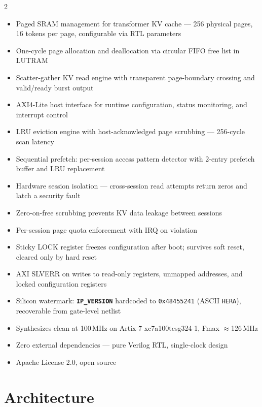 \documentclass[10pt, a4paper]{article}
\newcommand{\reg}[1]{\texttt{\textbf{#1}}}
\newcommand{\hex}[1]{\texttt{0x#1}}
\begin{document}
\begin{multicols}{2}
\begin{itemize}
  \item Paged SRAM management for transformer KV cache — 256 physical pages,
        16 tokens per page, configurable via RTL parameters
  \item One-cycle page allocation and deallocation via circular FIFO free list
        in LUTRAM
  \item Scatter-gather KV read engine with transparent page-boundary crossing
        and valid/ready burst output
  \item AXI4-Lite host interface for runtime configuration, status monitoring,
        and interrupt control
  \item LRU eviction engine with host-acknowledged page scrubbing — 256-cycle
        scan latency
  \item Sequential prefetch: per-session access pattern detector with 2-entry
        prefetch buffer and LRU replacement
  \item Hardware session isolation — cross-session read attempts return zeros
        and latch a security fault
  \item Zero-on-free scrubbing prevents KV data leakage between sessions
  \item Per-session page quota enforcement with IRQ on violation
  \item Sticky LOCK register freezes configuration after boot; survives soft
        reset, cleared only by hard reset
  \item AXI SLVERR on writes to read-only registers, unmapped addresses, and
        locked configuration registers
  \item Silicon watermark: \reg{IP\_VERSION} hardcoded to \hex{48455241}
        (ASCII \texttt{HERA}), recoverable from gate-level netlist
  \item Synthesizes clean at 100\,MHz on Artix-7 xc7a100tcsg324-1, Fmax
        $\approx$126\,MHz
  \item Zero external dependencies — pure Verilog RTL, single-clock design
  \item Apache License 2.0, open source
\end{itemize}
\end{multicols}

\section{Architecture}
\end{document}
